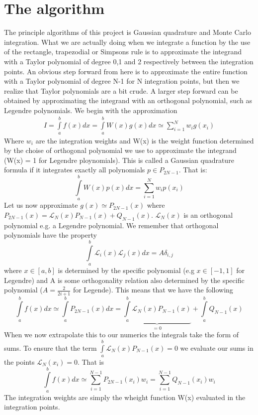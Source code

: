 \documentclass[a4paper,english, 10pt, twoside]{article}
\begin{document}
\section*{The algorithm}
The principle algorithms of this project is Gaussian quadrature and Monte Carlo integration. 
What we are actually doing when we integrate a function by the use of the rectangle, trapezodial or Simpsons rule is to 
approximate the integrand with a Taylor polynomial of degree 0,1 and 2 respectively between the integration points. An obvious 
step forward from here is to approximate the entire function with a Taylor polynomial of degree N-1 for N integration points, 
but then we realize that Taylor polynomials are a bit crude. A larger step forward can be obtained by approximating the 
integrand with an orthogonal polynomial, such as Legendre polynomials.  
We begin with the approximation
\begin{align*}
I = \int\limits^b_a f(x)dx = \int\limits_a^b W(x)g(x)dx \simeq \sum\limits_{i=1}^N w_i g(x_i)
\end{align*}
Where $w_i$ are the integration weights and W(x) is the weight function determined by the choise of orthogonal polynomial we use to 
approximate the integrand (W(x) = 1 for Legendre ploynomials).
This is called a Gaussian quadrature formula if it integrates exactly all polynomials $p \in P_{2N-1}$. That is:
$$
\int\limits_a^bW(x)p(x)dx = \sum\limits_{i=1}^Nw_ip(x_i)
$$
Let us now approximate $g(x) \simeq P_{2N-1}(x)$ where $P_{2N-1}(x) = \mathcal{L}_N(x)P_{N-1}(x)+Q_{N-1}(x)$. 
$\mathcal{L}_{N}(x)$ is an orthogonal polynomial e.g. a Legendre polynomial. We remember that orthogonal polynomials have the 
property
$$
\int\limits_a^b\mathcal{L}_i(x)\mathcal{L}_j(x)dx = A\delta_{i,j}
$$
where $x\in[a,b]$ is determined by the specific polynomial (e.g $x\in[-1,1]$ for Legendre) and A is some orthogonality relation 
also determined by the specific polynomial ($A = \frac{2}{2i+1}$ for Legende). This means that we have the following
$$
\int\limits_a^bf(x)dx \simeq \int\limits_a^bP_{2N-1}(x)dx =\underbrace{\int\limits_a^b\mathcal{L}_N(x)P_{N-1}(x)}_{=0} + 
\int\limits_a^bQ_{N-1}(x)
$$
When we now extrapolate this to our numerics the integrals take the form of sums. To ensure that the term 
$\int\limits_a^b\mathcal{L}_N(x)P_{N-1}(x) = 0$ we evaluate our sums in the points $\mathcal{L}_N(x_i) = 0$. That is
$$
\int\limits_a^bf(x)dx \simeq \sum\limits_{i=1}^{N-1}P_{2N-1}(x_i)w_i = \sum\limits_{i=1}^{N-1}Q_{N-1}(x_i)w_i
$$
The integration weights are simply the wheight function W(x) evaluated in the integration points.\\
\end{document}
